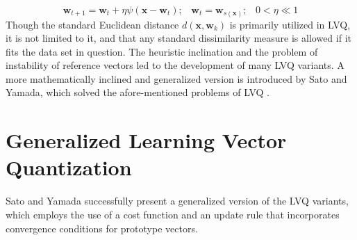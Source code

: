 \begin{equation}\label{update rule}
	\mathbf{w}_{t+1}=\mathbf{w}_{t} + \eta\psi\left( \mathbf{x}-\mathbf{w}_t\right) ;\hspace{10pt} \mathbf{w}_t=\mathbf{w}_{s\left( \mathbf{x}\right) } ; \hspace{10pt} 0<\eta\ll 1
\end{equation}
Though the standard Euclidean distance\hspace{2pt} $d\left( \mathbf{x},\mathbf{w}_k\right) $\hspace{2pt} is primarily utilized in LVQ, it is not limited to it, and that any standard dissimilarity measure is allowed if it fits the data set in question\cite{villmann2017can}.
The heuristic inclination and the problem of instability of reference vectors led to the development of many LVQ variants\cite{kohonen2001learning}. A more mathematically inclined and generalized version is introduced by Sato and Yamada, which solved the afore-mentioned problems of LVQ \cite{sato1996generalized}.
\section{Generalized Learning Vector Quantization}
Sato and Yamada successfully present a generalized version of the LVQ variants, which employs the use of a cost function and an update rule that incorporates convergence conditions for prototype vectors\cite{sato1996generalized}. 

